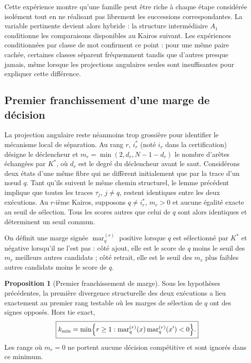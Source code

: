 \documentclass[11pt,a4paper]{article}
\theoremstyle{definition}
\newtheorem{propositionthm}[definition]{Proposition}
\theoremstyle{remark}
\begin{document}
Cette expérience montre qu'une famille peut être riche à chaque étape considérée isolément tout en ne réalisant pas librement les successions correspondantes. La variable pertinente devient alors hybride : la structure intermédiaire $A_1$ conditionne les comparaisons disponibles au Kairos suivant. Les expériences conditionnées par classe de mot confirment ce point : pour une même paire cachée, certaines classes séparent fréquemment tandis que d'autres presque jamais, même lorsque les projections angulaires seules sont insuffisantes pour expliquer cette différence.

\subsection{Premier franchissement d'une marge de décision}

La projection angulaire reste néanmoins trop grossière pour identifier le mécanisme local de séparation. Au rang $r$, $i_r^*$ (noté $i_r$ dans la certification) désigne le déclencheur et $m_r=\min(2,d_r,N-1-d_r)$ le nombre d’arêtes échangées par $K^*$, où $d_r$ est le degré du déclencheur avant le saut. Considérons deux états d'une même fibre qui ne diffèrent initialement que par la trace d'un nœud $q$. Tant qu'ils suivent le même chemin structurel, le lemme précédent implique que toutes les traces $\tau_j$, $j\neq q$, restent identiques entre les deux exécutions. Au $r$-ième Kairos, supposons $q\neq i_r^*$, $m_r>0$ et aucune égalité exacte au seuil de sélection. Tous les scores autres que celui de $q$ sont alors identiques et déterminent un seuil commun.

\pagebreak[4]
On définit une marge signée $\operatorname{mar}_q^{(r)}$ positive lorsque $q$ est sélectionné par $K^*$ et négative lorsqu'il ne l'est pas : côté ajout, elle est le score de $q$ moins le seuil des $m_r$ meilleurs autres candidats ; côté retrait, elle est le seuil des $m_r$ plus faibles autres candidats moins le score de $q$.

\begin{propositionthm}[Premier franchissement de marge]
Sous les hypothèses précédentes, la première divergence structurelle des deux exécutions a lieu exactement au premier rang testable où les marges de sélection de $q$ ont des signes opposés. Hors tie exact,
\[
\boxed{
 k_{\min}
 =\min\Bigl\{r\geq1:
 \operatorname{mar}_q^{(r)}(x)\operatorname{mar}_q^{(r)}(x')<0\Bigr\}.}
\]
Les rangs où $m_r=0$ ne portent aucune décision compétitive et sont ignorés dans ce minimum.
\end{propositionthm}
\end{document}
